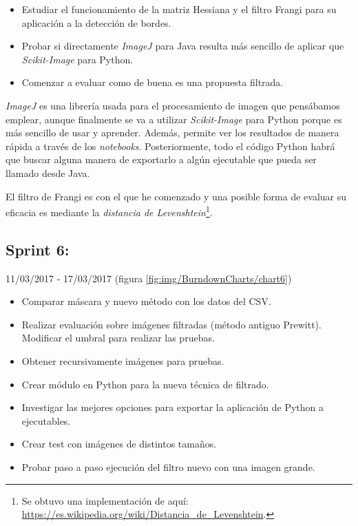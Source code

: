 \begin{itemize}
    \item Estudiar el funcionamiento de la matriz Hessiana y el filtro Frangi para su aplicación a la detección de bordes.
    \item Probar si directamente \textit{ImageJ} para Java resulta más sencillo de aplicar que \textit{Scikit-Image} para Python.
    \item Comenzar a evaluar como de buena es una propuesta filtrada.
\end{itemize}

\textit{ImageJ} es una librería usada para el procesamiento de imagen que pensábamos emplear, aunque finalmente se va a utilizar \textit{Scikit-Image} para Python porque es más sencillo de usar y aprender. Además, permite ver los resultados de manera rápida a través de los \textit{notebooks}. Posteriormente, todo el código Python habrá que buscar alguna manera de exportarlo a algún ejecutable que pueda ser llamado desde Java.

El filtro de Frangi es con el que he comenzado y una posible forma de evaluar su eficacia es mediante la \textit{distancia de Levenshtein}\footnote{Se obtuvo una implementación de aquí: \url{https://es.wikipedia.org/wiki/Distancia_de_Levenshtein}.}.

\newpage

\subsection{Sprint 6:}
11/03/2017 - 17/03/2017 (figura \ref{fig:img/BurndownCharts/chart6})


\begin{itemize}
    \item Comparar máscara y nuevo método con los datos del CSV.
    \item Realizar evaluación sobre imágenes filtradas (método antiguo Prewitt). Modificar el umbral para realizar las pruebas.
    \item Obtener recursivamente imágenes para pruebas.
    \item Crear módulo en Python para la nueva técnica de filtrado.
    \item Investigar las mejores opciones para exportar la aplicación de Python a ejecutables.
    \item Crear test con imágenes de distintos tamaños.
    \item Probar paso a paso ejecución del filtro nuevo con una imagen grande.
\end{itemize}

